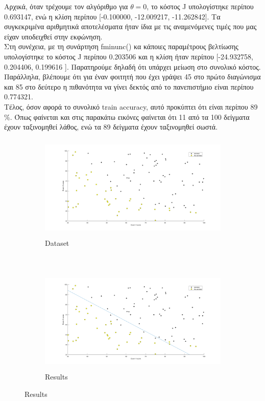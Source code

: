 \documentclass{article}
\begin{document}
	\noindent
	Aρχικά, ὀταν τρέχουμε τον αλγόριθμο για $θ=0$, το κόστος J υπολογίστηκε περίπου 0.693147, ενώ η κλίση περίπου [-0.100000, -12.009217, -11.262842]. Τα συγκεκριμένα αριθμητικά αποτελέσματα ήταν ίδια με τις αναμενόμενες τιμές που μας είχαν υποδειχθεί στην εκφώνηση.\\
	
	\noindent
	Στη συνέχεια, με τη συνάρτηση fminunc() κα κάποιες παραμέτρους βελτίωσης υπολογίστηκε το κόστος J περίπου 0.203506 και η κλίση ήταν περίπου [-24.932758, 0.204406, 0.199616 ]. Παρατηρούμε δηλαδή ότι υπάρχει μείωση στο συνολικό κόστος.\\
	
	\noindent
	Παράλληλα, βλέπουμε ότι για έναν φοιτητή που έχει γράψει 45 στο πρώτο διαγώνισμα και 85 στο δεύτερο η πιθανότητα να γίνει δεκτός από το πανεπιστήμιο είναι περίπου 0.774321.\\
	
	\noindent
	Tέλος, όσον αφορά το συνολικό train accuracy, αυτό προκύπτει ότι είναι περίπου 89 \%. Όπως φαίνεται και στις παρακάτω εικόνες φαίνεται ότι 11 από τα 100 δείγματα έχουν ταξινομηθεί λάθος, ενώ τα 89 δείγματα έχουν ταξινομηθεί σωστά.\\
	 
	\begin{figure}[h!]
		\centering
		\begin{subfigure}[t]{0.5\textwidth}
			\centering
			\includegraphics[height=5cm, width=\linewidth]{../exercise2_1/images/ex1_dataset.png}
			\caption{Dataset}
		\end{subfigure}%
		~
		\begin{subfigure}[t]{0.5\textwidth}
			\centering
			\includegraphics[height=5cm, width=\linewidth]{../exercise2_1/images/ex1_result.png}
			\caption{Results}
		\end{subfigure}
	\end{figure}
	
\end{document}
